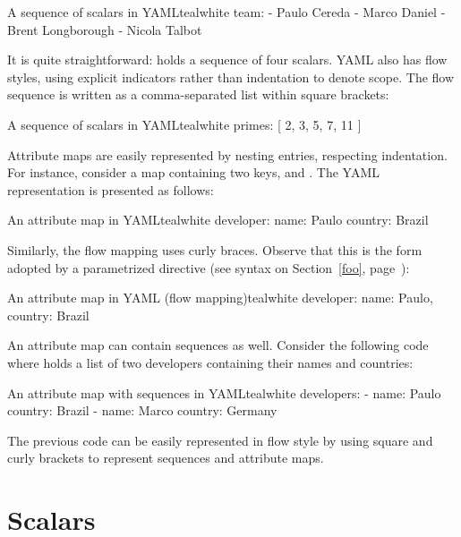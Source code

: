 \begin{codebox}{A sequence of scalars in YAML}{teal}{\icnote}{white}
team:
- Paulo Cereda
- Marco Daniel
- Brent Longborough
- Nicola Talbot
\end{codebox}

It is quite straightforward:  holds a sequence of four scalars. YAML also has flow styles, using explicit indicators rather than indentation to denote scope. The flow sequence is written as a comma-separated list within square brackets:

\begin{codebox}{A sequence of scalars in YAML}{teal}{\icnote}{white}
primes: [ 2, 3, 5, 7, 11 ]
\end{codebox}

Attribute maps are easily represented by nesting entries, respecting indentation. For instance, consider a map  containing two keys,  and . The YAML representation is presented as follows:

\begin{codebox}{An attribute map in YAML}{teal}{\icnote}{white}
developer:
 name: Paulo
 country: Brazil
\end{codebox}

Similarly, the flow mapping uses curly braces. Observe that this is the form adopted by a parametrized directive (see syntax on Section~\ref{foo}, page~\pageref{foo}):

\begin{codebox}{An attribute map in YAML (flow mapping)}{teal}{\icnote}{white}
developer: { name: Paulo, country: Brazil }
\end{codebox}

An attribute map can contain sequences as well. Consider the following code where  holds a list of two developers containing their names and countries:

\begin{codebox}{An attribute map with sequences in YAML}{teal}{\icnote}{white}
developers:
- name: Paulo
  country: Brazil
- name: Marco
  country: Germany
\end{codebox}

The previous code can be easily represented in flow style by using square and curly brackets to represent sequences and attribute maps.

\section{Scalars}
\label{sec:yamlscalars}

